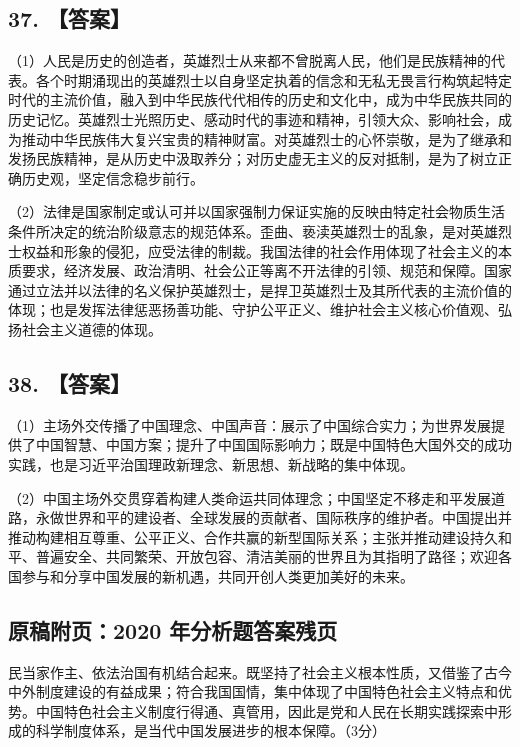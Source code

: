 \documentclass[UTF8,11pt]{ctexart}
\begin{document}
\subsection*{37. 【答案】}

（1）人民是历史的创造者，英雄烈士从来都不曾脱离人民，他们是民族精神的代表。各个时期涌现出的英雄烈士以自身坚定执着的信念和无私无畏言行构筑起特定时代的主流价值，融入到中华民族代代相传的历史和文化中，成为中华民族共同的历史记忆。英雄烈士光照历史、感动时代的事迹和精神，引领大众、影响社会，成为推动中华民族伟大复兴宝贵的精神财富。对英雄烈士的心怀崇敬，是为了继承和发扬民族精神，是从历史中汲取养分；对历史虚无主义的反对抵制，是为了树立正确历史观，坚定信念稳步前行。


（2）法律是国家制定或认可并以国家强制力保证实施的反映由特定社会物质生活条件所决定的统治阶级意志的规范体系。歪曲、亵渎英雄烈士的乱象，是对英雄烈士权益和形象的侵犯，应受法律的制裁。我国法律的社会作用体现了社会主义的本质要求，经济发展、政治清明、社会公正等离不开法律的引领、规范和保障。国家通过立法并以法律的名义保护英雄烈士，是捍卫英雄烈士及其所代表的主流价值的体现；也是发挥法律惩恶扬善功能、守护公平正义、维护社会主义核心价值观、弘扬社会主义道德的体现。


\subsection*{38. 【答案】}

（1）主场外交传播了中国理念、中国声音：展示了中国综合实力；为世界发展提供了中国智慧、中国方案；提升了中国国际影响力；既是中国特色大国外交的成功实践，也是习近平治国理政新理念、新思想、新战略的集中体现。


（2）中国主场外交贯穿着构建人类命运共同体理念；中国坚定不移走和平发展道路，永做世界和平的建设者、全球发展的贡献者、国际秩序的维护者。中国提出并推动构建相互尊重、公平正义、合作共赢的新型国际关系；主张并推动建设持久和平、普遍安全、共同繁荣、开放包容、清洁美丽的世界且为其指明了路径；欢迎各国参与和分享中国发展的新机遇，共同开创人类更加美好的未来。


\subsection*{原稿附页：2020 年分析题答案残页}

民当家作主、依法治国有机结合起来。既坚持了社会主义根本性质，又借鉴了古今中外制度建设的有益成果；符合我国国情，集中体现了中国特色社会主义特点和优势。中国特色社会主义制度行得通、真管用，因此是党和人民在长期实践探索中形成的科学制度体系，是当代中国发展进步的根本保障。（3分）
\end{document}
